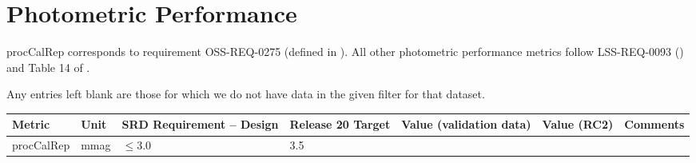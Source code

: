 \documentclass[DM,lsstdraft,toc]{lsstdoc}
\begin{document}
\section{Photometric Performance}\label{photometric-performance}

procCalRep corresponds to requirement OSS-REQ-0275 (defined in
). All other photometric performance
metrics follow LSS-REQ-0093 () and Table 14 of .

Any entries left blank are those for which we do not have data in the given filter for that dataset.

\begin{longtable}[]{@{}lllllll@{}}
\toprule
\begin{minipage}[b]{0.12\columnwidth}\raggedright\strut
Metric\strut
\end{minipage} & \begin{minipage}[b]{0.06\columnwidth}\raggedright\strut
Unit\strut
\end{minipage} & \begin{minipage}[b]{0.14\columnwidth}\raggedright\strut
SRD Requirement -- Design\strut
\end{minipage} & \begin{minipage}[b]{0.14\columnwidth}\raggedright\strut
Release 20 Target\strut
\end{minipage} & \begin{minipage}[b]{0.12\columnwidth}\raggedright\strut
Value (validation data)\strut
\end{minipage} & \begin{minipage}[b]{0.12\columnwidth}\raggedright\strut
Value (RC2) \strut
\end{minipage} & \begin{minipage}[b]{0.17\columnwidth}\raggedright\strut
Comments\strut
\end{minipage}\tabularnewline
\midrule
\endhead
\begin{minipage}[t]{0.12\columnwidth}\raggedright\strut
procCalRep\strut
\end{minipage} & \begin{minipage}[t]{0.06\columnwidth}\raggedright\strut
mmag\strut
\end{minipage} & \begin{minipage}[t]{0.14\columnwidth}\raggedright\strut
\(\leq 3.0\)\strut
\end{minipage} & \begin{minipage}[t]{0.14\columnwidth}\raggedright\strut
3.5\strut
\end{minipage} & \begin{minipage}[t]{0.12\columnwidth}\raggedright\strut

\end{minipage}
\end{longtable}
\end{document}
